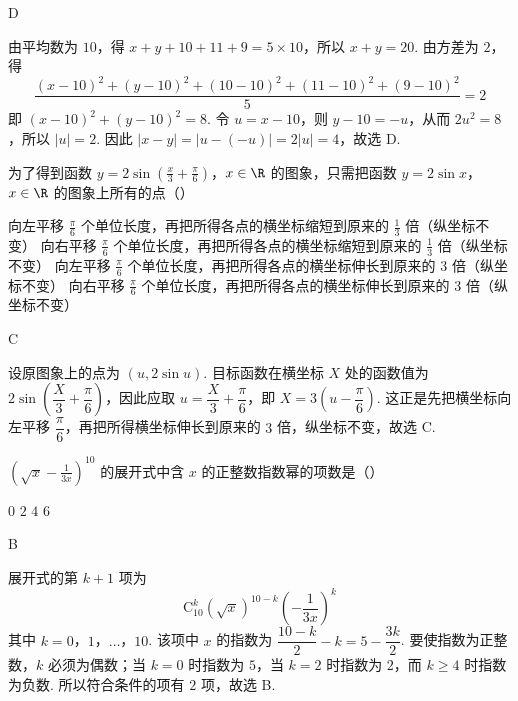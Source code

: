\begin{answer}
D
\end{answer}

\begin{solution}
由平均数为 \(10\)，得 \(x+y+10+11+9=5\times10\)，所以 \(x+y=20\). 由方差为 \(2\)，得
\[
\frac{(x-10)^2+(y-10)^2+(10-10)^2+(11-10)^2+(9-10)^2}{5}=2
\]
即 \((x-10)^2+(y-10)^2=8\). 令 \(u=x-10\)，则 \(y-10=-u\)，从而 \(2u^2=8\)，所以 \(|u|=2\). 因此 \(|x-y|=|u-(-u)|=2|u|=4\)，故选 D.
\end{solution}

\begin{problem}
为了得到函数 \(y = 2\sin \left(\frac{x}{3} + \frac{\pi}{6}\right)\)，\(x \in \R\) 的图象，只需把函数 \(y = 2\sin x\)，\(x \in \R\) 的图象上所有的点（\quad）

\choices
    {向左平移 \(\frac{\pi}{6}\) 个单位长度，再把所得各点的横坐标缩短到原来的 \(\frac{1}{3}\) 倍（纵坐标不变）}
    {向右平移 \(\frac{\pi}{6}\) 个单位长度，再把所得各点的横坐标缩短到原来的 \(\frac{1}{3}\) 倍（纵坐标不变）}
    {向左平移 \(\frac{\pi}{6}\) 个单位长度，再把所得各点的横坐标伸长到原来的 \(3\) 倍（纵坐标不变）}
    {向右平移 \(\frac{\pi}{6}\) 个单位长度，再把所得各点的横坐标伸长到原来的 \(3\) 倍（纵坐标不变）}
\end{problem}

\begin{answer}
C
\end{answer}

\begin{solution}
设原图象上的点为 \((u,2\sin u)\). 目标函数在横坐标 \(X\) 处的函数值为 \(2\sin\left(\dfrac{X}{3}+\dfrac{\pi}{6}\right)\)，因此应取 \(u=\dfrac{X}{3}+\dfrac{\pi}{6}\)，即 \(X=3\left(u-\dfrac{\pi}{6}\right)\). 这正是先把横坐标向左平移 \(\dfrac{\pi}{6}\)，再把所得横坐标伸长到原来的 \(3\) 倍，纵坐标不变，故选 C.
\end{solution}

\begin{problem}
\(\left(\sqrt{x} -\frac{1}{3x}\right)^{10}\) 的展开式中含 \(x\) 的正整数指数幂的项数是（\quad）

\choices
    {\(0\)}
    {\(2\)}
    {\(4\)}
    {\(6\)}
\end{problem}

\begin{answer}
B
\end{answer}

\begin{solution}
展开式的第 \(k+1\) 项为
\[
\mathrm C_{10}^{k}(\sqrt{x})^{10-k}\left(-\frac{1}{3x}\right)^k
\]
其中 \(k=0\)，\(1\)，\(\ldots\)，\(10\). 该项中 \(x\) 的指数为 \(\dfrac{10-k}{2}-k=5-\dfrac{3k}{2}\). 要使指数为正整数，\(k\) 必须为偶数；当 \(k=0\) 时指数为 \(5\)，当 \(k=2\) 时指数为 \(2\)，而 \(k\geqslant4\) 时指数为负数. 所以符合条件的项有 \(2\) 项，故选 B.
\end{solution}

